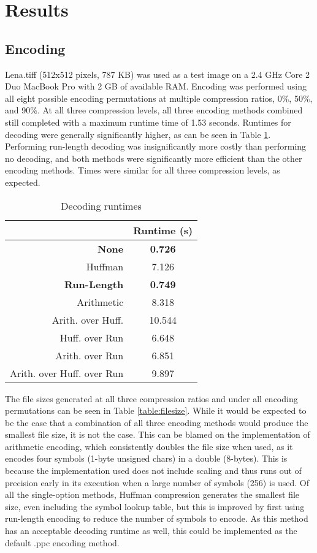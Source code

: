 \documentclass[10pt,twocolumn,twoside]{IEEEtran}
\begin{document}
\section{Results}

\subsection{Encoding}
Lena.tiff (512x512 pixels, 787 KB) was used as a test image on a 2.4 GHz Core 2 Duo MacBook Pro with 2 GB of available RAM. Encoding was performed using all eight possible encoding permutations at multiple compression ratios, 0\%, 50\%, and 90\%. At all three compression levels, all three encoding methods combined still completed with a maximum runtime time of 1.53 seconds. Runtimes for decoding were generally significantly higher, as can be seen in Table \ref{table:decode_times}. Performing run-length decoding was insignificantly more costly than performing no decoding, and both methods were significantly more efficient than the other encoding methods. Times were similar for all three compression levels, as expected.

\begin{table}[htdp]
\caption{Decoding runtimes}
\vskip -15pt
\label{table:decode_times}
\small{
\begin{center}
\begin{tabular}{|r|c|}
\hline
 & Runtime (s) \\
 \hline
 \textbf{None} & \textbf{0.726}\\
 \hline
 Huffman & 7.126\\
 \hline
 \textbf{Run-Length} & \textbf{0.749}\\
 \hline
 Arithmetic & 8.318\\
 \hline
 Arith. over Huff. & 10.544\\
 \hline
 Huff. over Run & 6.648\\
 \hline
 Arith. over Run & 6.851\\
 \hline
 Arith. over Huff. over Run & 9.897\\
 \hline
\end{tabular}
\end{center}
}
\end{table}

The file sizes generated at all three compression ratios and under all encoding permutations can be seen in Table \ref{table:filesize}. While it would be expected to be the case that a combination of all three encoding methods would produce the smallest file size, it is not the case. This can be blamed on the implementation of arithmetic encoding, which consistently doubles the file size when used, as it encodes four symbols (1-byte unsigned chars) in a double (8-bytes). This is because the implementation used does not include scaling and thus runs out of precision early in its execution when a large number of symbols (256) is used. Of all the single-option methods, Huffman compression generates the smallest file size, even including the symbol lookup table, but this is improved by first using run-length encoding to reduce the number of symbols to encode. As this method has an acceptable decoding runtime as well, this could be implemented as the default .ppc encoding method.
\end{document}
